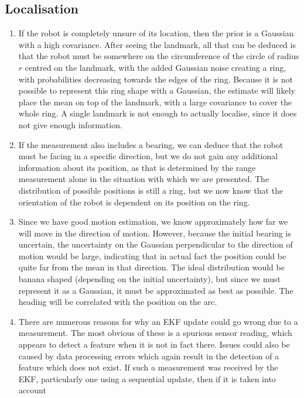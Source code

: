 \documentclass[a4paper,12pt]{article}
\begin{document}
\subsection{Localisation}
\begin{enumerate}[resume]
\item If the robot is completely unsure of its location, then the prior is a
  Gaussian with a high covariance. After seeing the landmark, all that can be
  deduced is that the robot must be somewhere on the circumference of the circle
  of radius $r$ centred on the landmark, with the added Gaussian noise creating
  a ring, with probabilities decreasing towards the edges of the ring. Because
  it is not possible to represent this ring shape with a Gaussian, the estimate
  will likely place the mean on top of the landmark, with a large covariance to
  cover the whole ring. A single landmark is not enough to actually localise,
  since it does not give enough information.
\item If the measurement also includes a bearing, we can deduce that the robot
  must be facing in a specific direction, but we do not gain any additional
  information about its position, as that is determined by the range measurement
  alone in the situation with which we are presented. The distribution of
  possible positions is still a ring, but we now know that the orientation of
  the robot is dependent on its position on the ring.
\item Since we have good motion estimation, we know approximately how far we
  will move in the direction of motion. However, because the initial bearing is
  uncertain, the uncertainty on the Gaussian perpendicular to the direction of
  motion would be large, indicating that in actual fact the position could be
  quite far from the mean in that direction. The ideal distribution would be
  banana shaped (depending on the initial uncertainty), but since we must
  represent it as a Gaussian, it must be approximated as best as possible. The
  heading will be correlated with the position on the arc.
\item There are numerous reasons for why an EKF update could go wrong due to a
  measurement. The most obvious of these is a spurious sensor reading, which
  appears to detect a feature when it is not in fact there. Issues could also be
  caused by data processing errors which again result in the detection of a
  feature which does not exist. If such a measurement was received by the EKF,
  particularly one using a sequential update, then if it is taken into account

\end{enumerate}
\end{document}
